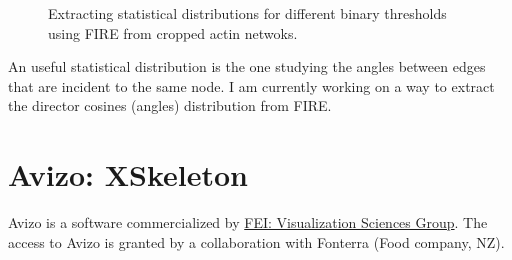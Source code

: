 \begin{figure}[h]
\begin{center}
\end{center}
\caption[Distributions of length and degree in FIRE]{Extracting statistical
distributions for different binary thresholds using FIRE from cropped
actin netwoks.}
\label{fig:fire_histograms}
\end{figure}

An useful statistical distribution is the one studying the angles between edges
that are incident to the same node. I am currently working on a way to extract
the director cosines (angles) distribution from FIRE.

\section{Avizo: XSkeleton}
 Avizo is a software commercialized by
 \href{http://www.vsg3d.com/avizo/overview}{FEI: Visualization Sciences Group}.
The access to Avizo is granted by a collaboration with Fonterra (Food company,
NZ).

